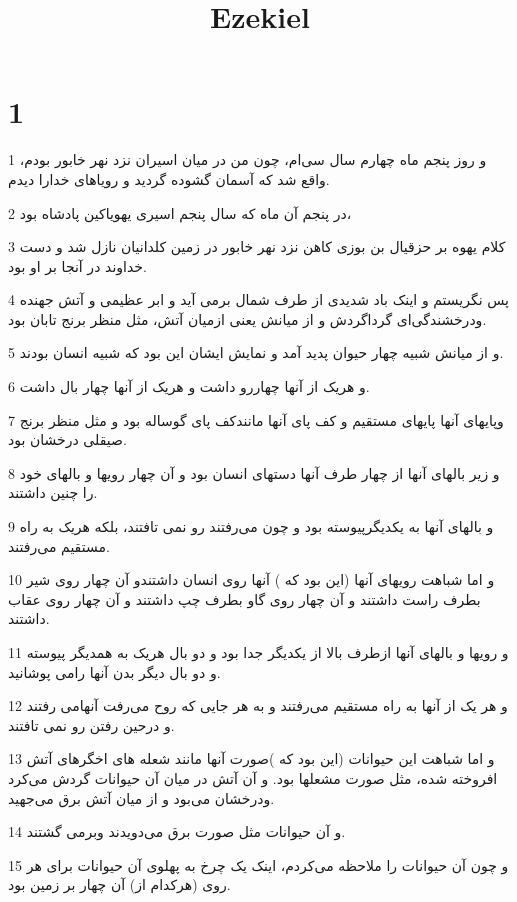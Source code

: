 

\title{Ezekiel}


\chapter{1}

\par 1 و روز پنجم ماه چهارم سال سی‌ام، چون من در میان اسیران نزد نهر خابور بودم، واقع شد که آسمان گشوده گردید و رویاهای خدارا دیدم.
\par 2 در پنجم آن ماه که سال پنجم اسیری یهویاکین پادشاه بود،
\par 3 کلام یهوه بر حزقیال بن بوزی کاهن نزد نهر خابور در زمین کلدانیان نازل شد و دست خداوند در آنجا بر او بود.
\par 4 پس نگریستم و اینک باد شدیدی از طرف شمال برمی آید و ابر عظیمی و آتش جهنده ودرخشندگی‌ای گرداگردش و از میانش یعنی ازمیان آتش، مثل منظر برنج تابان بود.
\par 5 و از میانش شبیه چهار حیوان پدید آمد و نمایش ایشان این بود که شبیه انسان بودند.
\par 6 و هریک از آنها چهاررو داشت و هریک از آنها چهار بال داشت.
\par 7 وپایهای آنها پایهای مستقیم و کف پای آنها مانندکف پای گوساله بود و مثل منظر برنج صیقلی درخشان بود.
\par 8 و زیر بالهای آنها از چهار طرف آنها دستهای انسان بود و آن چهار رویها و بالهای خود را چنین داشتند.
\par 9 و بالهای آنها به یکدیگرپیوسته بود و چون می‌رفتند رو نمی تافتند، بلکه هریک به راه مستقیم می‌رفتند.
\par 10 و اما شباهت رویهای آنها (این بود که ) آنها روی انسان داشتندو آن چهار روی شیر بطرف راست داشتند و آن چهار روی گاو بطرف چپ داشتند و آن چهار روی عقاب داشتند.
\par 11 و رویها و بالهای آنها ازطرف بالا از یکدیگر جدا بود و دو بال هریک به همدیگر پیوسته و دو بال دیگر بدن آنها رامی پوشانید.
\par 12 و هر یک از آنها به راه مستقیم می‌رفتند و به هر جایی که روح می‌رفت آنهامی رفتند و درحین رفتن رو نمی تافتند.
\par 13 و اما شباهت این حیوانات (این بود که )صورت آنها مانند شعله های اخگرهای آتش افروخته شده، مثل صورت مشعلها بود. و آن آتش در میان آن حیوانات گردش می‌کرد ودرخشان می‌بود و از میان آتش برق می‌جهید.
\par 14 و آن حیوانات مثل صورت برق می‌دویدند وبرمی گشتند.
\par 15 و چون آن حیوانات را ملاحظه می‌کردم، اینک یک چرخ به پهلوی آن حیوانات برای هر روی (هرکدام از) آن چهار بر زمین بود.
